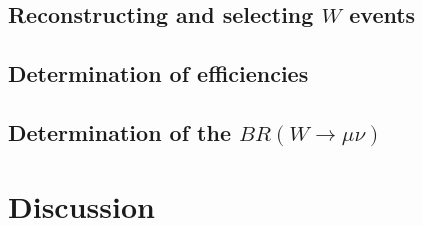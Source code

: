 \documentclass[twoside,        %
               BCOR12mm,       %
               ngerman,english, %
               fleqn,headsepline=false,footsepline=false
              ]{Vorlage/MFPREPORT}
\begin{document}
\subsection{Reconstructing and selecting $W$ events}
\subsection{Determination of efficiencies}
\subsection{Determination of the $BR(W\rightarrow\mu\nu)$}
\section{Discussion}
\label{sec:discussion}

\newpage
\end{document}
